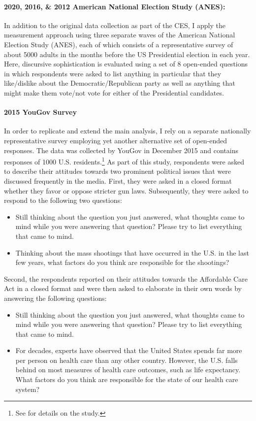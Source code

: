 \documentclass[12pt]{article}
\begin{document}
\paragraph{2020, 2016, \& 2012 American National Election Study (ANES):}
In addition to the original data collection as part of the CES, I apply the measurement approach using three separate waves of the American National Election Study (ANES), each of which consists of a representative survey of about 5000 adults in the months before the US Presidential election in each year. Here, discursive sophistication is evaluated using a set of 8 open-ended questions in which respondents were asked to list anything in particular that they like/dislike about the Democratic/Republican party as well as anything that might make them vote/not vote for either of the Presidential candidates.

\paragraph{2015 YouGov Survey}
In order to replicate and extend the main analysis, I rely on a separate nationally representative survey employing yet another alternative set of open-ended responses. The data was collected by YouGov in December 2015 and contains responses of 1000 U.S. residents.\footnote{See \citet{clifford2018disgust} for details on the study.} As part of this study, respondents were asked to describe their attitudes towards two prominent political issues that were discussed frequently in the media. First, they were asked in a closed format whether they favor or oppose stricter gun laws. Subsequently, they were asked to respond to the following two questions:
\begin{itemize}\setlength\itemsep{0em}
	\item Still thinking about the question you just answered, what thoughts came to mind while you were answering that question? Please try to list everything that came to mind.
	\item Thinking about the mass shootings that have occurred in the U.S. in the last few years, what factors do you think are responsible for the shootings?
\end{itemize}
Second, the respondents reported on their attitudes towards the Affordable Care Act in a closed format and were then asked to elaborate in their own words by answering the following questions:
\begin{itemize}\setlength\itemsep{0em}
	\item Still thinking about the question you just answered, what thoughts came to mind while you were answering that question? Please try to list everything that came to mind.
	\item For decades, experts have observed that the United States spends far more per person on health care than any other country. However, the U.S. falls behind on most measures of health care outcomes, such as life expectancy. What factors do you think are responsible for the state of our health care system?
\end{itemize}
\end{document}
